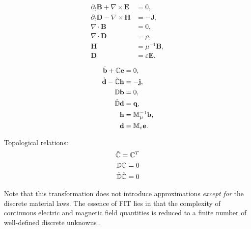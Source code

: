 \documentclass{report}
\begin{document}
\begin{minipage}{0.3\textwidth}
\begin{align*}
    \partial_t \mathbf{B} + \nabla \times \mathbf{E} &= 0, \\
    \partial_t \mathbf{D} - \nabla \times \mathbf{H} &= -\mathbf{J}, \\
    \nabla \cdot \mathbf{B} &= 0,  \\
    \nabla \cdot \mathbf{D} &= \rho, \\
    \mathbf{H} &= \mu^{-1} \mathbf{B}, \\
    \mathbf{D} &= \varepsilon \mathbf{E}. 
\end{align*}
\end{minipage}
\begin{minipage}{0.1\textwidth}
\centering
{}
\end{minipage}
\begin{minipage}{0.3\textwidth}
\begin{align*}
    \dot{\mathbf{b}} + \mathbb{C}\mathbf{e} &= 0 , \\
    \dot{\mathbf{d}} - \Tilde{\mathbb{C}}\mathbf{h} &= - \mathbf{j}, \\
    \mathbb{D}\mathbf{b} &= 0,  \\
    \Tilde{\mathbb{D}}\mathbf{d} &= \mathbf{q},  \\
    \mathbf{h} &= \mathbb{M}_\mu^{-1} \mathbf{b}, \\
    \mathbf{d} &= \mathbb{M}_{\varepsilon} \mathbf{e}. 
\end{align*}
\end{minipage}
\begin{minipage}{0.2\textwidth}
Topological relations:
\begin{align*}
    \Tilde{\mathbb{C}} = \mathbb{C}^T \\
    \mathbb{D}\mathbb{C} = 0 \\
    \Tilde{\mathbb{D}}\Tilde{\mathbb{C}} = 0
\end{align*}
\end{minipage}

\hfill

Note that this transformation does not introduce approximations \emph{except for} the discrete material laws. The essence of FIT lies in that the complexity of continuous electric and magnetic field quantities
is reduced to a finite number of well-defined discrete unknowns \citep{weiland_2003}.
\end{document}
